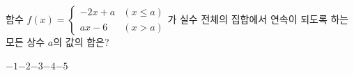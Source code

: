 함수 $f(x)=\begin{cases} -2x+a & (x\le a) \\ ax-6 & (x>a) \end{cases}$가 실수 전체의 집합에서 연속이 되도록 하는 모든 상수 $a$의 값의 합은?
\begin{choices32}{$-1$}{$-2$}{$-3$}{$-4$}{$-5$}\end{choices32}
